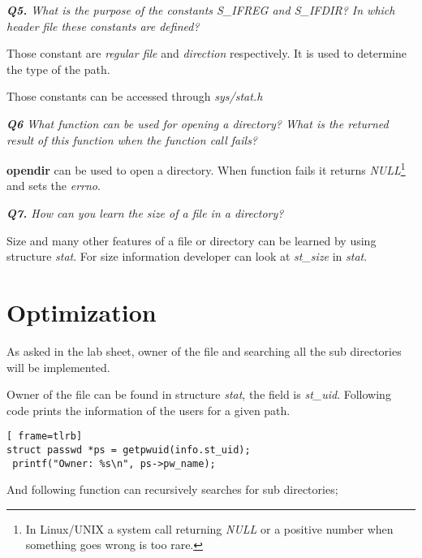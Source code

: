 \documentclass[11pt]{article}
\begin{document}
\vspace{5mm}
\textit{\textbf{Q5.} What is the purpose of the constants S\_IFREG and S\_IFDIR? In which header file these constants are defined?}
\vspace{5mm}

Those constant are \textit{regular file} and \textit{direction} respectively. It is used to determine the type of the path. 

Those constants can be accessed through \textit{sys/stat.h}

\vspace{5mm}
\textit{\textbf{Q6} What function can be used for opening a directory? What is the returned result of this function when the function call fails?}
\vspace{5mm}

\textbf{opendir} can be used to open a directory. When function fails it returns \textit{NULL}\footnote{In Linux/UNIX a system call returning \textit{NULL} or a positive number when something goes wrong is too rare.} and sets the \textit{errno}.

\vspace{5mm}
\textit{\textbf{Q7.} How can you learn the size of a file in a directory?}
\vspace{5mm}

Size and many other features of a file or directory can be learned by using structure \textit{stat}. For size information developer can look at \textit{st\_size} in \textit{stat}.


\section*{Optimization}

As asked in the lab sheet, owner of the file and searching all the sub directories will be implemented.

Owner of the file can be found in structure \textit{stat}, the field is \textit{st\_uid}. Following code prints the information of the users for a given path.

\vspace{5mm}
\begin{minipage}{1\textwidth}
\begin{lstlisting}[ frame=tlrb]
struct passwd *ps = getpwuid(info.st_uid);
 printf("Owner: %s\n", ps->pw_name);
\end{lstlisting}
\end{minipage}

And following function can recursively searches for sub directories;
\end{document}
